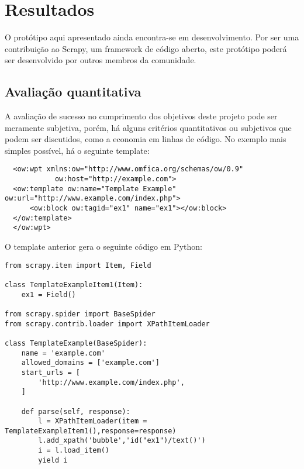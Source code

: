 \chapter{Resultados}

O protótipo aqui apresentado ainda encontra-se em desenvolvimento. Por ser uma contribuição ao Scrapy, um framework de código aberto, este protótipo poderá ser desenvolvido por outros membros da comunidade.

\section{Avaliação quantitativa}

A avaliação de sucesso no cumprimento dos objetivos deste projeto pode ser meramente subjetiva, porém, há alguns critérios quantitativos ou subjetivos que podem ser discutidos, como a economia em linhas de código. No exemplo mais simples possível, há o seguinte template:

\begin{lstlisting}
  <ow:wpt xmlns:ow="http://www.omfica.org/schemas/ow/0.9"
            ow:host="http://example.com">
  <ow:template ow:name="Template Example" ow:url="http://www.example.com/index.php">
      <ow:block ow:tagid="ex1" name="ex1"></ow:block>
  </ow:template> 
  </ow:wpt>
\end{lstlisting}

O template anterior gera o seguinte código em Python:

\pagebreak
{}
\begin{lstlisting}
from scrapy.item import Item, Field

class TemplateExampleItem1(Item):
    ex1 = Field()

from scrapy.spider import BaseSpider
from scrapy.contrib.loader import XPathItemLoader

class TemplateExample(BaseSpider):
    name = 'example.com'
    allowed_domains = ['example.com']
    start_urls = [
        'http://www.example.com/index.php',
    ]
    
    def parse(self, response):
        l = XPathItemLoader(item = TemplateExampleItem1(),response=response)
        l.add_xpath('bubble','id("ex1")/text()') 
        i = l.load_item()
        yield i
\end{lstlisting}

